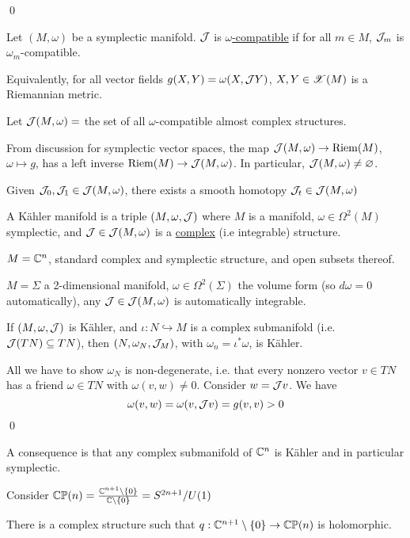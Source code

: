 \documentclass[x11names,reqno,14pt]{extarticle}
\newcommand{\into}{\hookrightarrow}
\DeclareMathOperator{\Riem}{Riem}
\begin{document}
\proof

\qed


Let $(M,\omega)$ be a symplectic manifold. $\mathcal{J}$ is \underline{$\omega$-compatible} if for all $m \in M$, $\mathcal{J}_m$ is $\omega_m$-compatible. 

Equivalently, for all vector fields $g(X, Y) = \omega(X,\mathcal{J}Y)$, $X, Y \in \mathscr{X}(M)$ is a Riemannian metric. 

Let $\mathcal{J}(M,\omega) =$ the set of all $\omega$-compatible almost complex structures. 

From discussion for symplectic vector spaces, the map $\mc{J}(M,\omega) \to \Riem(M)$, $\omega \mapsto g$, has a left inverse $\Riem(M) \to \mc{J}(M,\omega)$. In particular, $\mathcal{J}(M,\omega)\neq\varnothing$. 

Given $\mathcal{J}_0,\mathcal{J}_1\in\mathcal{J}(M,\omega)$, there exists a smooth homotopy $\mathcal{J}_t\in\mathcal{J}(M,\omega)$


A K\"ahler manifold is a triple $(M,\omega,\mathcal{J})$ where $M$ is a manifold, $\omega\in\Omega^2(M)$ symplectic, and $\mathcal{J}\in\mathcal{J}(M,\omega)$ is a \underline{complex} (i.e integrable) structure. 

\exm

$M = \mathbb{C}^n$, standard complex and symplectic structure, and open subsets thereof. 

\exm 

$M = \Sigma$ a 2-dimensional manifold, $\omega\in\Omega^2(\Sigma)$ the volume form (so $d\omega = 0$ automatically), any $\mathcal{J}\in\mathcal{J}(M,\omega)$ is automatically integrable. 

\prop

If $(M,\omega,\mathcal{J})$ is K\"ahler, and $\iota:N \into M$ is a complex submanifold (i.e. $\mathcal{J}(TN) \subseteq TN$), then $(N,\omega_N, \mathcal{J}_M)$, with $\omega_n = \iota^*\omega$, is K\"ahler. 

\proof

All we have to show $\omega_N$ is non-degenerate, i.e. that every nonzero vector $v\in TN$ has a friend $\omega\in TN$ with $\omega(v,w)\neq0$. Consider $w = \mathcal{J}v$. We have
\[
\omega(v,w) = \omega(v,\mathcal{J}v) = g(v,v) > 0
\]
\qed

A consequence is that any complex submanifold of $\mathbb{C}^n$ is K\"ahler and in particular symplectic. 

Consider ${\mathbb{CP}}(n) = \frac{\mathbb{C}^{n+1}\setminus\{0\}}{\mathbb{C}\setminus\{0\}}= S^{2n+1}/U(1)$

There is a complex structure such that $q:\mathbb{C}^{n+1}\setminus\{0\} \to {\mathbb{CP}}(n)$ is holomorphic. 
\end{document}
